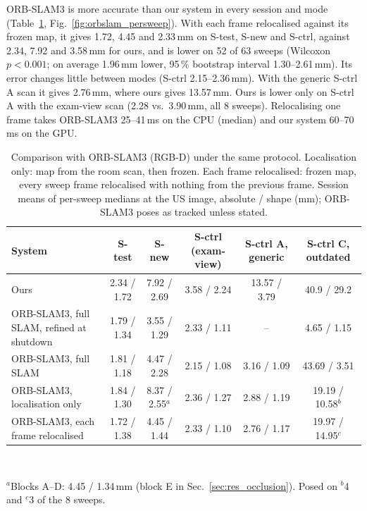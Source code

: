 \documentclass[9pt,shortpaper,twoside,web]{ieeecolor2}
\newcommand{\Stest}{S-test}
\newcommand{\Snew}{S-new}
\newcommand{\Sctrl}{S-ctrl}
\begin{document}
ORB-SLAM3 is more accurate than our system in every session and mode (Table~\ref{tab:slam}, Fig.~\ref{fig:orbslam_persweep}). With each frame relocalised against its frozen map, it gives 1.72, 4.45 and 2.33\,mm on \Stest{}, \Snew{} and \Sctrl{}, against 2.34, 7.92 and 3.58\,mm for ours, and is lower on 52 of 63 sweeps (Wilcoxon $p<0.001$; on average 1.96\,mm lower, 95\,\% bootstrap interval 1.30--2.61\,mm). Its error changes little between modes (\Sctrl{} 2.15--2.36\,mm). With the generic \Sctrl{} A scan it gives 2.76\,mm, where ours gives 13.57\,mm. Ours is lower only on \Sctrl{} A with the exam-view scan (2.28 vs.\ 3.90\,mm, all 8 sweeps). Relocalising one frame takes ORB-SLAM3 25--41\,ms on the CPU (median) and our system 60--70\,ms on the GPU.

\begin{table}[t]
  \caption{Comparison with ORB-SLAM3 (RGB-D) under the same protocol. Localisation only: map from the room scan, then frozen. Each frame relocalised: frozen map, every sweep frame relocalised with nothing from the previous frame. Session means of per-sweep medians at the US image, absolute / shape (mm); ORB-SLAM3 poses as tracked unless stated.}
  \label{tab:slam}
  \centering
  \scriptsize
  \setlength{\tabcolsep}{4pt}
  \begin{tabular}{@{}lccccc@{}}
    \toprule
    System & \Stest{} & \Snew{} & \Sctrl{} (exam-view) & \Sctrl{} A, generic & \Sctrl{} C, outdated\\
    \midrule
    Ours & 2.34 / 1.72 & 7.92 / 2.69 & 3.58 / 2.24 & 13.57 / 3.79 & 40.9 / 29.2\\
    ORB-SLAM3, full SLAM, refined at shutdown & 1.79 / 1.34 & 3.55 / 1.29 & 2.33 / 1.11 & -- & 4.65 / 1.15\\
    ORB-SLAM3, full SLAM & 1.81 / 1.18 & 4.47 / 2.28 & 2.15 / 1.08 & 3.16 / 1.09 & 43.69 / 3.51\\
    ORB-SLAM3, localisation only & 1.84 / 1.30 & 8.37 / 2.55$^{a}$ & 2.36 / 1.27 & 2.88 / 1.19 & 19.19 / 10.58$^{b}$\\
    ORB-SLAM3, each frame relocalised & 1.72 / 1.38 & 4.45 / 1.44 & 2.33 / 1.10 & 2.76 / 1.17 & 19.97 / 14.95$^{c}$\\
    \bottomrule
  \end{tabular}\\[2pt]
  \raggedright\footnotesize $^{a}$Blocks A--D: 4.45 / 1.34\,mm (block E in Sec.~\ref{sec:res_occlusion}). Posed on $^{b}$4 and $^{c}$3 of the 8 sweeps.
\end{table}
\end{document}
